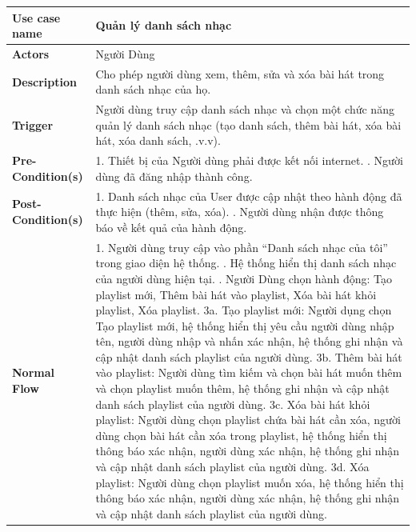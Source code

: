 \documentclass[a4paper]{article}
\newcommand{\cach}{\hspace*{1.5em}\ignorespaces}
\begin{document}
\begin{table}[h!]
\centering
\renewcommand{\arraystretch}{1.3} %
\begin{tabularx}{\textwidth}{|l|X|}
\hline
\textbf{Use case name} & Quản lý danh sách nhạc \\ \hline
\textbf{Actors}        & Người Dùng \\ \hline
\textbf{Description}   & Cho phép người dùng xem, thêm, sửa và xóa bài hát trong danh sách nhạc của họ. \\ \hline
\textbf{Trigger}       & Người dùng truy cập danh sách nhạc và chọn một chức năng quản lý danh sách nhạc (tạo danh sách, thêm bài hát, xóa bài hát, xóa danh sách, .v.v). \\ \hline
\textbf{Pre-Condition(s)} 
& 1. Thiết bị của Người dùng phải được kết nối internet. \newline
  2. Người dùng đã đăng nhập thành công. \\ \hline
\textbf{Post-Condition(s)} 
& 1. Danh sách nhạc của User được cập nhật theo hành động đã thực hiện (thêm, sửa, xóa). \newline
  2. Người dùng nhận được thông báo về kết quả của hành động. \\ \hline
\textbf{Normal Flow}   
& 1. Người dùng truy cập vào phần “Danh sách nhạc của tôi” trong giao diện hệ thống. \newline
  2. Hệ thống hiển thị danh sách nhạc của người dùng hiện tại. \newline
  3. Người Dùng chọn hành động: Tạo playlist mới, Thêm bài hát vào playlist, Xóa bài hát khỏi playlist, Xóa playlist. \newline
  \cach 3a. Tạo playlist mới: Người dụng chọn Tạo playlist mới, hệ thống hiển thị yêu cầu người dùng nhập tên, người dùng nhập và nhấn xác nhận, hệ thống ghi nhận và cập nhật danh sách playlist của người dùng. \newline
  \cach 3b. Thêm bài hát vào playlist: Người dùng tìm kiếm và chọn bài hát muốn thêm và chọn playlist muốn thêm, hệ thống ghi nhận và cập nhật danh sách playlist của người dùng. \newline
  \cach 3c. Xóa bài hát khỏi playlist: Người dùng chọn playlist chứa bài hát cần xóa, người dùng chọn bài hát cần xóa trong playlist, hệ thống hiển thị thông báo xác nhận, người dùng xác nhận, hệ thống ghi nhận và cập nhật danh sách playlist của người dùng. \newline
  \cach 3d. Xóa playlist: Người dùng chọn playlist muốn xóa, hệ thống hiển thị thông báo xác nhận, người dùng xác nhận, hệ thống ghi nhận và cập nhật danh sách playlist của người dùng. \\ \hline

\end{tabularx}
\end{table}
\end{document}

